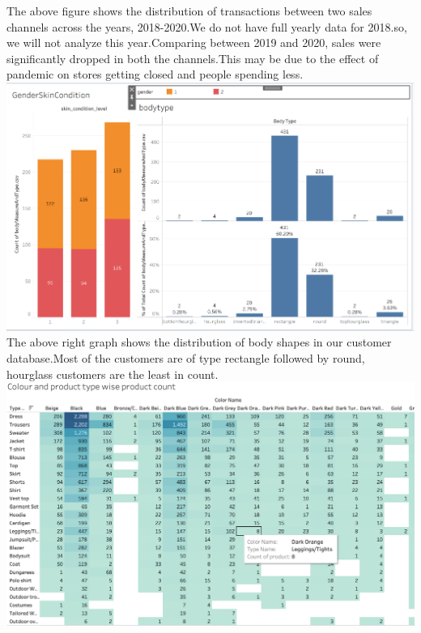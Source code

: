 \documentclass[11pt,journal,compsoc]{IEEEtran}
\begin{document}
The above figure shows the distribution of transactions between two sales channels across the years, 2018-2020.We do not have full yearly data for 2018.so, we will not analyze this year.Comparing between 2019 and 2020, sales were significantly dropped in both the channels.This may be due to the  effect of pandemic on stores getting closed and people spending less. \\
\includegraphics[scale=0.3]{images/skin.png} \\
The above right graph shows the distribution of body shapes in our customer database.Most of the customers are of type rectangle followed by round, hourglass customers are the least in count. \\
\includegraphics[scale=0.14]{images/color.png} \\
\end{document}
